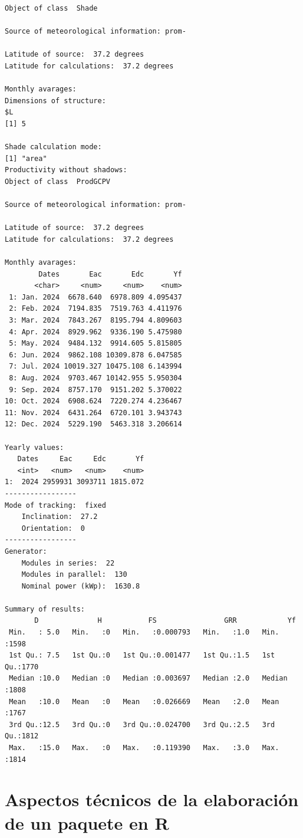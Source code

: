 \begin{verbatim}
Object of class  Shade 

Source of meteorological information: prom- 

Latitude of source:  37.2 degrees
Latitude for calculations:  37.2 degrees

Monthly avarages:
Dimensions of structure:
$L
[1] 5

Shade calculation mode:
[1] "area"
Productivity without shadows:
Object of class  ProdGCPV 

Source of meteorological information: prom- 

Latitude of source:  37.2 degrees
Latitude for calculations:  37.2 degrees

Monthly avarages:
        Dates       Eac       Edc       Yf
       <char>     <num>     <num>    <num>
 1: Jan. 2024  6678.640  6978.809 4.095437
 2: Feb. 2024  7194.835  7519.763 4.411976
 3: Mar. 2024  7843.267  8195.794 4.809603
 4: Apr. 2024  8929.962  9336.190 5.475980
 5: May. 2024  9484.132  9914.605 5.815805
 6: Jun. 2024  9862.108 10309.878 6.047585
 7: Jul. 2024 10019.327 10475.108 6.143994
 8: Aug. 2024  9703.467 10142.955 5.950304
 9: Sep. 2024  8757.170  9151.202 5.370022
10: Oct. 2024  6908.624  7220.274 4.236467
11: Nov. 2024  6431.264  6720.101 3.943743
12: Dec. 2024  5229.190  5463.318 3.206614

Yearly values:
   Dates     Eac     Edc       Yf
   <int>   <num>   <num>    <num>
1:  2024 2959931 3093711 1815.072
-----------------
Mode of tracking:  fixed 
    Inclination:  27.2 
    Orientation:  0 
-----------------
Generator:
    Modules in series:  22 
    Modules in parallel:  130 
    Nominal power (kWp):  1630.8 

Summary of results:
       D              H           FS                GRR            Yf      
 Min.   : 5.0   Min.   :0   Min.   :0.000793   Min.   :1.0   Min.   :1598  
 1st Qu.: 7.5   1st Qu.:0   1st Qu.:0.001477   1st Qu.:1.5   1st Qu.:1770  
 Median :10.0   Median :0   Median :0.003697   Median :2.0   Median :1808  
 Mean   :10.0   Mean   :0   Mean   :0.026669   Mean   :2.0   Mean   :1767  
 3rd Qu.:12.5   3rd Qu.:0   3rd Qu.:0.024700   3rd Qu.:2.5   3rd Qu.:1812  
 Max.   :15.0   Max.   :0   Max.   :0.119390   Max.   :3.0   Max.   :1814
\end{verbatim}


\section{Aspectos técnicos de la elaboración de un paquete en R}
\label{sec:orgf3fdf25}
\label{sec:aspectos-tecnicos}
